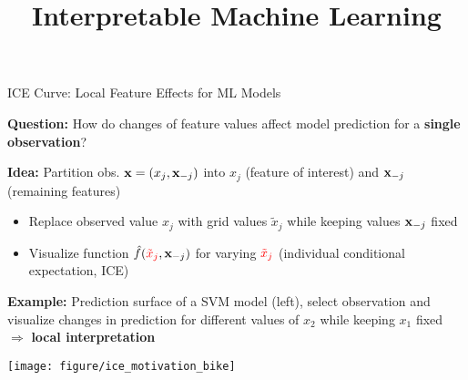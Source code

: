 \documentclass[11pt,compress,t,notes=noshow, aspectratio=169, xcolor=table,dvipsnames]{beamer}
\title{Interpretable Machine Learning}
\date{}
\begin{document}


\begin{frame}{ICE Curve: Local Feature Effects for ML Models}

\textbf{Question:} How do changes of feature values affect model prediction for a \textbf{single observation}?



\textbf{Idea:} Partition obs. $\mathbf{x} = (x_j, \mathbf{x}_{-j})$ into $x_j$ (feature of interest) and $\mathbf{x}_{-j}$ (remaining features) 
\begin{itemize}
    \item Replace observed value $x_j$ with {\color{red} grid values $\tilde x_j$} while keeping values $\mathbf{x}_{-j}$ fixed
    \item Visualize function $\hat{f}({\color{red}\tilde x_j}, \mathbf{x}_{-j})$ for varying ${\color{red}\tilde x_j}$ (individual conditional expectation, ICE)%
\end{itemize}

\pause

\textbf{Example:} Prediction surface of a SVM model (left), select observation and visualize changes in prediction for different values of $x_2$ while keeping $x_1$ fixed $\Rightarrow$ \textbf{local interpretation}

\vfill
\centering
\texttt{[image: figure/ice\_motivation\_bike]}

\end{frame}
\end{document}
